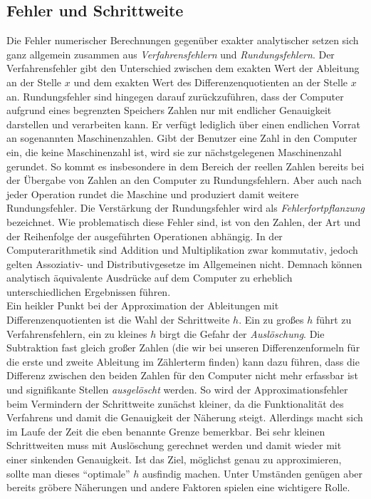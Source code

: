 \documentclass{scrartcl}
\begin{document}
\subsection{Fehler und Schrittweite}
\label{ssec:schrittweite}
Die Fehler numerischer Berechnungen gegenüber exakter analytischer setzen sich ganz allgemein zusammen aus \textit{Verfahrensfehlern} und \textit{Rundungsfehlern}.\cite{westermann} Der Verfahrensfehler gibt den Unterschied zwischen dem exakten Wert der Ableitung an der Stelle $x$ und dem exakten Wert des Differenzenquotienten an der Stelle $x$ an. Rundungsfehler sind hingegen darauf zurückzuführen, dass der Computer aufgrund eines begrenzten Speichers Zahlen nur mit endlicher Genauigkeit darstellen und verarbeiten kann. Er verfügt lediglich über einen endlichen Vorrat an sogenannten Maschinenzahlen. Gibt der Benutzer eine Zahl in den Computer ein, die keine Maschinenzahl ist, wird sie zur nächstgelegenen Maschinenzahl gerundet. So kommt es insbesondere in dem Bereich der reellen Zahlen bereits bei der Übergabe von Zahlen an den Computer zu Rundungsfehlern. Aber auch nach jeder Operation rundet die Maschine und produziert damit weitere Rundungsfehler. Die Verstärkung der Rundungsfehler wird als \textit{Fehlerfortpflanzung} bezeichnet. Wie problematisch diese Fehler sind, ist von den Zahlen, der Art und der Reihenfolge der ausgeführten Operationen abhängig. In der Computerarithmetik sind Addition und Multiplikation zwar kommutativ, jedoch gelten Assoziativ- und Distributivgesetze im Allgemeinen nicht. Demnach können analytisch äquivalente Ausdrücke auf dem Computer zu erheblich unterschiedlichen Ergebnissen führen.\cite{nla} \\
Ein heikler Punkt bei der Approximation der Ableitungen mit Differenzenquotienten ist die Wahl der Schrittweite $h$.
Ein zu großes $h$ führt zu Verfahrensfehlern, ein zu kleines $h$ birgt die Gefahr der \textit{Auslöschung}.
Die Subtraktion fast gleich großer Zahlen (die wir bei unseren Differenzenformeln für die erste und zweite Ableitung im Zählerterm finden) kann dazu führen, dass die Differenz zwischen den beiden Zahlen für den Computer nicht mehr erfassbar ist und signifikante Stellen \textit{ausgelöscht} werden.\cite{am}
So wird der Approximationsfehler beim Vermindern der Schrittweite zunächst kleiner, da die Funktionalität des Verfahrens und damit die Genauigkeit der Näherung steigt.
Allerdings macht sich im Laufe der Zeit die eben benannte Grenze bemerkbar. Bei sehr kleinen Schrittweiten muss mit Auslöschung gerechnet werden und damit wieder mit einer sinkenden Genauigkeit.\cite{schneebeli}
Ist das Ziel, möglichst genau zu approximieren, sollte man dieses "`optimale"' $h$ ausfindig machen.
Unter Umständen genügen aber bereits gröbere Näherungen und andere Faktoren spielen eine wichtigere Rolle. \\
\end{document}

